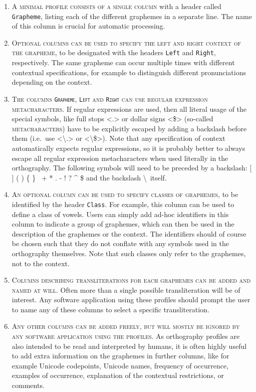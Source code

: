 \begin{enumerate}
	\def\labelenumi{A\arabic{enumi}.} \setcounter{enumi}{4} 
	\item \textsc{A minimal profile consists of a single column} with a header
       called \texttt{Grapheme}, listing each of the different graphemes in a
       separate line. The name of this column is crucial for automatic 
       processing.
	\item \textsc{Optional columns can be used to specify the left and right
       context of the grapheme}, to be designated with the headers \texttt{Left}
       and \texttt{Right}, respectively. The same grapheme can occur multiple
       times with different contextual specifications, for example to
       distinguish different pronunciations depending on the context. 
	\item \textsc{The columns \texttt{Grapheme}, \texttt{Left} and \texttt{Right}
       can use regular expression metacharacters.} If regular expressions are
       used, then all literal usage of the special symbols, like full stops <.>
       or dollar signs <\$> (so-called \textsc{metacharacters}) have to be
       explicitly escaped by adding a backslash before them (i.e.~use
       <\textbackslash.> or <\textbackslash\$>). Note that any specification of
       context automatically expects regular expressions, so it is probably
       better to always escape all regular expression metacharacters when used
       literally in the orthography. The following symbols will need to be
       preceded by a backslash: {[} {]} ( ) \{ \} ~+ * . - ! ? \^{} \$ and the
       backslash \textbackslash~itself. 
	\item \textsc{An optional column can be used to specify classes of graphemes},
       to be identified by the header \texttt{Class}. For example, this column
       can be used to define a class of vowels. Users can simply add ad-hoc
       identifiers in this column to indicate a group of graphemes, which can
       then be used in the description of the graphemes or the context. The
       identifiers should of course be chosen such that they do not conflate
       with any symbols used in the orthography themselves. Note that such
       classes only refer to the graphemes, not to the context. 
	\item \textsc{Columns describing transliterations for each graphemes can be
       added and named at will}. Often more than a single possible
       transliteration will be of interest. Any software application using these
       profiles should prompt the user to name any of these columns to select a
       specific transliteration. 
	\item \textsc{Any other columns can be added freely, but will mostly be ignored
       by any software application using the profiles}. As orthography profiles
       are also intended to be read and interpreted by humans, it is often
       highly useful to add extra information on the graphemes in further
       columns, like for example Unicode codepoints, Unicode names, frequency of
       occurrence, examples of occurrence, explanation of the contextual
       restrictions, or comments. 
 \end{enumerate}

